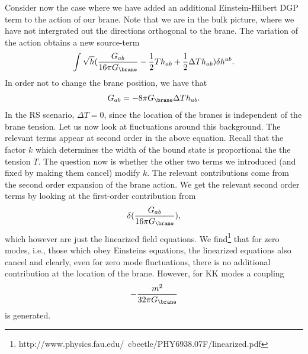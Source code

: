 Consider now the case where we have added an additional Einstein-Hilbert DGP term to the action of our brane. Note that we are in the bulk picture, where we have not intergrated out the directions orthogonal to the brane. The variation of the action obtains a new source-term
\begin{align}
    \int\sqrt{h}(\frac{G_{ab}}{16 \pi G_\brane}   - \frac 1 2 T h_{ab} + \frac 1 2 \Delta T h_{ab}) \delta h^{ab}.
\end{align}
In order not to change the brane position, we have that 
\begin{align}
     G_{ab} = - 8 \pi G_\brane \Delta T h_{ab}. 
\end{align}
In the RS scenario, $\Delta T =0$, since the location of the branes is independent of the brane tension. 
Let us now look at fluctuations around this background. The relevant terms appear at second order in the above equation. Recall that the factor $k$ which determines the width of the bound state is proportional the the tension $T$. The question now is whether the other two terms we introduced (and fixed by making them cancel) modify $k$. The relevant contributions come from the second order expansion of the brane action. We get the relevant second order terms by looking at the first-order contribution from 
\begin{align}
    \delta(\frac{G_{ab}}{16 \pi G_\brane}),
\end{align}
which however are just the linearized field equations. We find\footnote{http://www.physics.fau.edu/~cbeetle/PHY6938.07F/linearized.pdf} that for zero modes, i.e., those which obey Einsteins equations, the linearized equations also cancel and clearly, even for zero mode fluctuations, there is no additional contribution at the location of the brane. However, for KK modes a coupling 
\begin{align}
 - \frac{m^2}{32 \pi G_\brane}
\end{align}
is generated.



